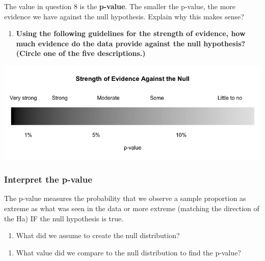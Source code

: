 \documentclass[
]{report}
\providecommand{\tightlist}{%
  \setlength{\itemsep}{0pt}\setlength{\parskip}{0pt}}
\begin{document}
The value in question 8 is the \textbf{p-value}. The smaller the p-value, the more evidence we have against the null hypothesis. Explain why this makes sense?

\vspace{0.5in}

\begin{enumerate}
\def\labelenumi{\arabic{enumi}.}
\setcounter{enumi}{8}
\tightlist
\item
  \textbf{Using the following guidelines for the strength of evidence, how much evidence do the data provide against the null hypothesis? (Circle one of the five descriptions.)}
\end{enumerate}

\begin{center}\includegraphics[width=0.9\linewidth]{images/soe_gradient_grayscale} \end{center}

\hypertarget{interpret-the-p-value}{%
\subsubsection{Interpret the p-value}\label{interpret-the-p-value}}

The p-value measures the probability that we observe a sample proportion as extreme as what was seen in the data or more extreme (matching the direction of the Ha) IF the null hypothesis is true.

\begin{enumerate}
\def\labelenumi{\arabic{enumi}.}
\setcounter{enumi}{9}
\tightlist
\item
  What did we assume to create the null distribution?
\end{enumerate}

\vspace{1in}

\begin{enumerate}
\def\labelenumi{\arabic{enumi}.}
\setcounter{enumi}{10}
\tightlist
\item
  What value did we compare to the null distribution to find the p-value?
\end{enumerate}
\end{document}
